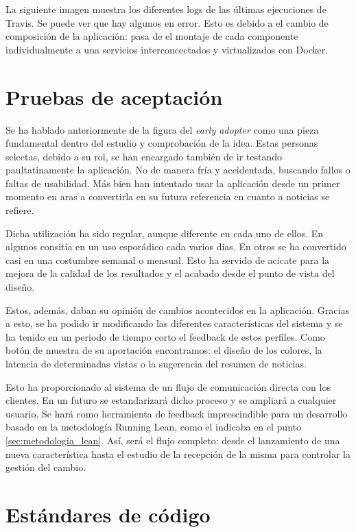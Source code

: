 La siguiente imagen muestra los diferentes logs de las últimas ejecuciones de Travis. Se puede ver que hay algunos en error. Esto es debido a el cambio de composición de la aplicación: pasa de el montaje de cada componente individualmente a una servicios interconcectados y virtualizados con Docker.

\section{Pruebas de aceptación}\label{sec:pruebas_aceptacion}

Se ha hablado anteriormente de la figura del \textit{early adopter} como una pieza fundamental dentro del estudio y comprobación de la idea. Estas personas selectas, debido a su rol, se han encargado también de ir testando paultatinamente la aplicación. No de manera fría y accidentada, buscando fallos o faltas de usabilidad. Más bien han intentado usar la aplicación desde un primer momento en aras a convertirla en su futura referencia en cuanto a noticias se refiere.

Dicha utilización ha sido regular, aunque diferente en cada uno de ellos. En algunos consitía en un uso esporádico cada varios días. En otros se ha convertido casi en una costumbre semanal o mensual. Esto ha servido de acicate para la mejora de la calidad de los resultados y el acabado desde el punto de vista del diseño.

Estos, además, daban su opinión de cambios acontecidos en la aplicación. Gracias a esto, se ha podido ir modificando las diferentes características del sistema y se ha tenido en un periodo de tiempo corto el feedback de estos perfiles. Como botón de muestra de su aportación encontramos: el diseño de los colores, la latencia de determinadas vistas o la sugerencia del resumen de noticias.

Esto ha proporcionado al sistema de un flujo de comunicación directa con los clientes. En un futuro se estandarizará dicho proceso y se ampliará a cualquier usuario. Se hará como herramienta de feedback imprescindible para un desarrollo basado en la metodología Running Lean, como el indicaba en el punto \ref{sec:metodologia_lean}. Así, será el flujo completo: desde el lanzamiento de una nueva característica hasta el estudio de la recepción de la misma para controlar la gestión del cambio.

\section{Estándares de código}\label{sec:estandares_codigo}

